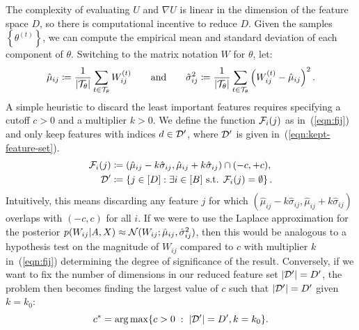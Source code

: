 The complexity of evaluating $U$ and $\nabla U$ is linear in 
the dimension of the feature space $D$,
so there is computational incentive to reduce $D$.
Given the samples $\left\{ \theta^{(t)} \right\}$, we can compute the empirical mean and standard deviation of each component of $\theta$. 
Switching to the matrix notation $W$ for $\theta$,
let:
%
\begin{equation}
	\hat{\mu}_{ij} \coloneqq \frac{1}{|\mathcal{T}_\theta|} \sum_{t \in \mathcal{T}_\theta} W_{ij}^{(t)} \qquad \textrm{and} \qquad
	\hat{\sigma}_{ij}^2 \coloneqq \frac{1}{|\mathcal{T}_\theta|} \sum_{t \in \mathcal{T}_\theta} \left( W_{ij}^{(t)} - \hat{\mu}_{ij} \right)^2.
\end{equation}
%
A simple heuristic to discard the least important features requires specifying a cutoff $c > 0$ and a multiplier $k > 0$. We define the function $\mathcal{F}_i(j)$ 
as in~(\ref{eqn:fij}) and only keep features with indices $d \in \mathcal{D}'$, where $\mathcal{D}'$ is given in~(\ref{eqn:kept-feature-set}).
%
\begin{align}
	\mathcal{F}_i(j) &\coloneqq (\hat{\mu}_{ij} - k \hat{\sigma}_{ij}, \hat{\mu}_{ij} + k \hat{\sigma}_{ij}) \cap (-c, +c),
	\label{eqn:fij} \\
	\mathcal{D}' &\coloneqq \left\{ j \in [D] : \exists i \in [B] \textrm{ s.t. }  \mathcal{F}_i(j) = \emptyset \right\}.
	\label{eqn:kept-feature-set}
\end{align}
%
Intuitively, this means discarding any feature $j$ for which 
$(\hat{\mu}_{ij} - k\hat{\sigma}_{ij}, \hat{\mu}_{ij} + k \hat{\sigma}_{ij})$ overlaps with
$(-c, c)$ for all $i$. If we were to use the Laplace approximation for the posterior $p(W_{ij} | A, X) \approx \mathcal{N}(W_{ij}; \hat{\mu}_{ij}, \hat{\sigma}_{ij}^2)$, then this would be analogous to a hypothesis test on the magnitude of $W_{ij}$ compared to $c$ with multiplier $k$ in~(\ref{eqn:fij}) determining the degree of significance of the result. Conversely, if we want to fix the number of dimensions in our reduced feature set $|\mathcal{D}'|=D'$, the problem then becomes finding the largest value of $c$ such that $|\mathcal{D}'|=D'$ given $k=k_0$:
%
\begin{equation}
	c^* = \operatorname*{arg\,max} \{c>0\; : \;|\mathcal{D}'| = D', k=k_0\}.
	\label{eqn:c-star}
\end{equation}

